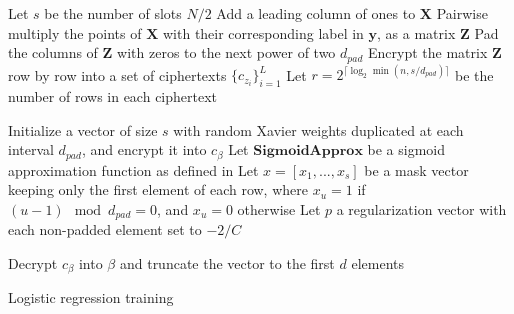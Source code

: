 \documentclass[a4paper,11pt,oneside]{report}
\begin{document}
\begin{algorithm}

  \LinesNumbered
  \DontPrintSemicolon
  \SetAlgoLined

  
  Let $s$ be the number of slots $N / 2$\;
  \;
  Add a leading column of ones to $\mathbf{X}$\;
  Pairwise multiply the points of $\mathbf{X}$ with their corresponding label in $\mathbf{y}$, as a matrix $\mathbf{Z}$\;
  Pad the columns of $\mathbf{Z}$ with zeros to the next power of two $d_{pad}$\;
  Encrypt the matrix $\mathbf{Z}$ row by row into a set of ciphertexts $\{c_{z_i}\}_{i=1}^L$\;
  Let $r = 2^{\lceil\log_2\min(n, s / d_{pad})\rceil}$ be the number of rows in each ciphertext\;

  \;
  Initialize a vector of size $s$ with random Xavier weights duplicated at each interval $d_{pad}$, and encrypt it into $c_\beta$\;
  Let $\mathbf{SigmoidApprox}$ be a sigmoid approximation function as defined in \cite{kim_logistic_2018}\;
  Let $x = [x_1, ..., x_s]$ be a mask vector keeping only the first element of each row, where $x_u = 1$ if $(u-1) \mod d_{pad}=0$, and $x_u=0$ otherwise\;
  Let $p$ a regularization vector with each non-padded element set to $-2/C$\;

  \;
  Decrypt $c_\beta$ into $\beta$ and truncate the vector to the first $d$ elements\;

\caption{Logistic regression training}
\label{algo:lr_training}

\end{algorithm}
\end{document}
